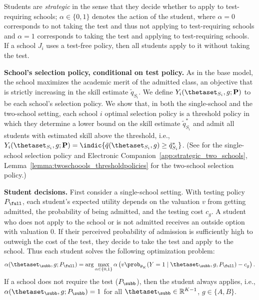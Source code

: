 Students are \textit{strategic} in the sense that they decide whether to apply to test-requiring schools; $\alpha\in\{0,1\}$ denotes the action of the student, where $\alpha =0$ corresponds to not taking the test and thus not applying to test-requiring schools and $\alpha = 1$ corresponds to taking the test and applying to test-requiring schools.
If a school $J_i$ uses a test-free policy, then all students apply to it without taking the test.

\smallskip
\noindent\textbf{School's selection policy, conditional on test policy.}
As in the base model, the school maximizes the academic merit of the admitted class,
an objective that is strictly increasing in the skill estimate $\tilde q_{S_i}$. We define $Y_i(\thetaset_{S_i}, g; \mathbf{P})$ to be each school's selection policy. We show that, in both the single-school and the two-school setting, each school $i$ optimal selection policy is a threshold policy in which they determine a lower bound on the skill estimate $\tilde{q}^*_{S_i}$ and admit all students with estimated skill above the threshold, i.e., $Y_i(\thetaset_{S_i}, g; \mathbf{P}) = \indic\{\tilde q (\thetaset_{S_i}, g) \geq \tilde q^*_{S_i}\}$.  (See  for the single-school selection policy and Electronic Companion~\ref{app:strategic_two_schools}, Lemma~\ref{lemma:twoschoools_thresholdpolicies} for the two-school selection policy.)



\smallskip
\noindent\textbf{Student decisions.}
First consider a single-school setting. With testing policy $P_{\full}$, each student's expected utility depends on the valuation $v$ from getting admitted, the probability of being admitted, and the testing cost $c_g$. A student who does not apply to the school or is not admitted receives an outside option with valuation 0.  If their perceived probability of admission is sufficiently high to outweigh the cost of the test, they decide to take the test and apply to the school.
Thus each student solves the following optimization problem:
\begin{equation}
\label{eq.student.decision.cost.theta}
    \alpha(\thetaset_{\subb}, g; P_{\full})=\arg \max_{\alpha \in \{0,1\}} \alpha \left( v \prob_{\theta_K} (Y = 1 \mid \thetaset_{\subb}, g, P_{\full}) -  c_g \right).
\end{equation}
If a school does not require the test ($P_{\subb}$), then the student always applies, i.e., $\alpha(\thetaset_{\subb}, g; P_{\subb}) =1$ for all $\thetaset_{\subb} \in \mathbb{R}^{K-1}$, $g \in \{A,B\}$.


